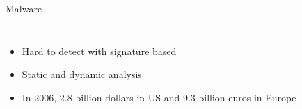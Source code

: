 \documentclass{beamer}
\begin{document}
\begin{frame}[h]{Malware}
\begin{columns}
\begin{column}{5cm}
\begin{figure}[t]
\begin{center}
      \end{center}
    \end{figure}
  \end{column}
\end{columns}
\begin{itemize}
  \item Hard to detect with signature based
  \item Static and dynamic analysis
  \item In 2006, 2.8 billion dollars in US and 9.3 billion euros in Europe
\end{itemize}
\end{frame}
\end{document}
